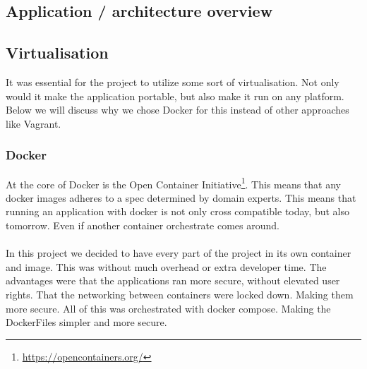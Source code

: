 \documentclass[12pt]{article}
\begin{document}
\subsection{Application / architecture overview}


\subsection{Virtualisation}
It was essential for the project to utilize some sort of virtualisation. Not only would it make the application portable, but also make it run on any platform. Below we will discuss why we chose Docker for this instead of other approaches like Vagrant. 

\subsubsection{Docker}
At the core of Docker is the Open Container Initiative\footnote{\url{https://opencontainers.org/}}. This means that any docker images adheres to a spec determined by domain experts. This means that running an application with docker is not only cross compatible today, but also tomorrow. Even if another container orchestrate comes around. 
\\\\
In this project we decided to have every part of the project in its own container and image. This was without much overhead or extra developer time. The advantages were that the applications ran more secure, without elevated user rights. That the networking between containers were locked down. Making them more secure. All of this was orchestrated with docker compose. Making the DockerFiles simpler and more secure.   
\end{document}
